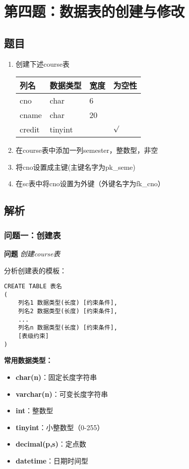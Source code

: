 \section{第四题：数据表的创建与修改}

\subsection{题目}

\begin{enumerate}
  \item 创建下述course表

    \begin{tabular}{|l|l|l|l|}
      \hline
      列名 & 数据类型 & 宽度 & 为空性 \\
      \hline
      cno & char & 6 & \\
      \hline
      cname & char & 20 & \\
      \hline
      credit & tinyint & & $\surd$ \\
      \hline
    \end{tabular}
  \item 在course表中添加一列semester，整数型，非空
  \item 将cno设置成主键(主键名字为pk\_seme)
  \item 在sc表中将cno设置为外键（外键名字为fk\_cno）
\end{enumerate}

\subsection{解析}

\subsubsection{问题一：创建表}

\textbf{问题} \emph{创建course表}

\qquad 分析创建表的模板：

\begin{mdframed}[backgroundcolor=gray!10]
\begin{verbatim}
CREATE TABLE 表名
(
    列名1 数据类型(长度) [约束条件],
    列名2 数据类型(长度) [约束条件],
    ...
    列名n 数据类型(长度) [约束条件],
    [表级约束]
)
\end{verbatim}
\end{mdframed}

\textbf{常用数据类型：}
\begin{itemize}
  \item \textbf{char(n)}：固定长度字符串
  \item \textbf{varchar(n)}：可变长度字符串
  \item \textbf{int}：整数型
  \item \textbf{tinyint}：小整数型（0-255）
  \item \textbf{decimal(p,s)}：定点数
  \item \textbf{datetime}：日期时间型
\end{itemize}

